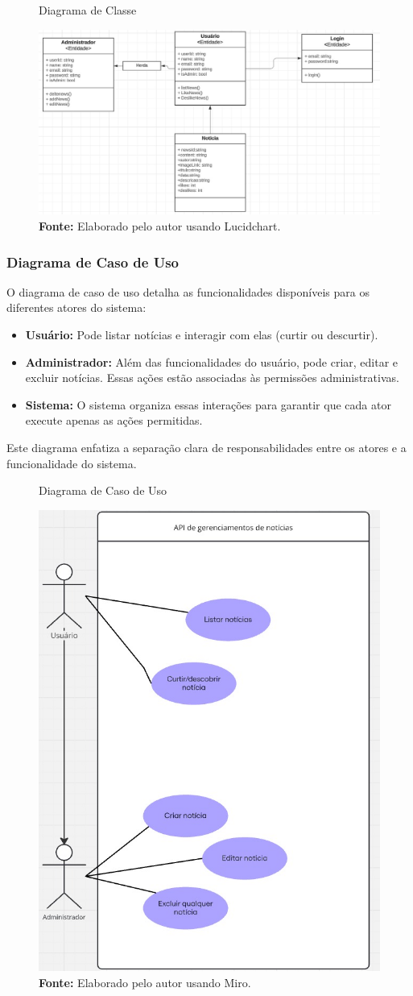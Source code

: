\begin{figure} [H]
    \centering
    \caption{Diagrama de Classe}
    \includegraphics[width=0.5\linewidth]{imagens/diagram de objeto.jpeg}
    \caption*{\textbf{Fonte:} Elaborado pelo autor usando Lucidchart.}
    \label{fig:enter-label}
\end{figure}

\subsubsection{Diagrama de Caso de Uso}

O diagrama de caso de uso detalha as funcionalidades disponíveis para os diferentes atores do sistema:
\begin{itemize}
    \item \textbf{Usuário:} Pode listar notícias e interagir com elas (curtir ou descurtir).
    \item \textbf{Administrador:} Além das funcionalidades do usuário, pode criar, editar e excluir notícias. Essas ações estão associadas às permissões administrativas.
    \item \textbf{Sistema:} O sistema organiza essas interações para garantir que cada ator execute apenas as ações permitidas.
\end{itemize}
Este diagrama enfatiza a separação clara de responsabilidades entre os atores e a funcionalidade do sistema.



\begin{figure} [H]
    \centering
    \caption{Diagrama de Caso de Uso}
    \includegraphics[width=0.5\linewidth]{imagens/diagram de caso de uso.jpeg}
    \caption*{\textbf{Fonte:} Elaborado pelo autor usando Miro.}
    \label{fig:enter-label}
\end{figure}




